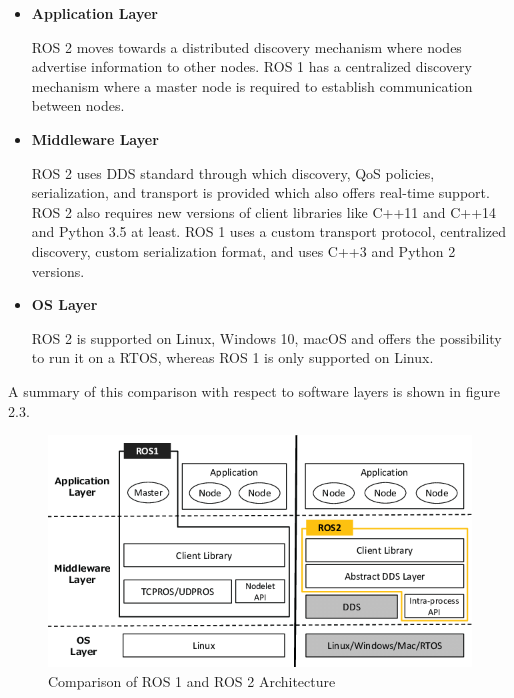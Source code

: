 \documentclass[%
xelatex,
	oneside,		%
	12pt,			%
	parskip=half,	%
	abstracton,
	chapterprefix=true%
    appendixprefix=true]
{scrbook}
\begin{document}
\begin{itemize}
\item {\bfseries Application Layer}


\vspace*{0.25cm}
ROS 2 moves towards a distributed discovery mechanism where nodes advertise information to other nodes. ROS 1 has a centralized discovery mechanism where a master node is required to establish communication between nodes.
\vspace*{0.25cm}
\item {\bfseries Middleware Layer}


\vspace*{0.25cm}
ROS 2 uses DDS standard through which discovery, QoS policies, serialization, and transport is provided which also offers real-time support. ROS 2 also requires new versions of client libraries like C++11 and C++14 and Python 3.5 at least. ROS 1 uses a custom transport protocol, centralized discovery, custom serialization format, and uses C++3 and Python 2 versions.
\vspace*{0.25cm}
\item {\bfseries OS Layer}


\vspace*{0.25cm}
ROS 2 is supported on Linux, Windows 10, macOS and offers the possibility to run it on a RTOS, whereas ROS 1 is only supported on Linux.
\vspace*{0.25cm}
\end{itemize}
A summary of this comparison with respect to software layers is shown in figure 2.3.
			\begin{figure}[ht]
\begin{center}
\includegraphics[scale=0.6]{fig/ros1_vs_ros2.jpg}
\caption[Comparison of ROS 1 and ROS 2 Architecture]{Comparison of ROS 1 and ROS 2 Architecture \cite{rosvsros2}}
\label{fig:rosvsros2}
\end{center}
\end{figure} 
\end{document}
